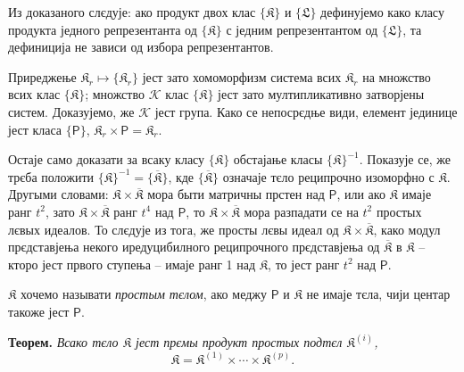 \documentclass[11pt]{article}
\begin{document}
Из доказаного слєдује: ако продукт двох клас \(\{\mathfrak K\}\) и \(\{\mathfrak L\}\) дефинујемо како класу продукта једного репрезентанта од \(\{\mathfrak K\}\) с једним репрезентантом од \(\{\mathfrak L\}\), та дефиниција не зависи од избора репрезентантов.

Приреджење \(\mathfrak K_r\mapsto\{\mathfrak K_r\}\) јест зато хомоморфизм система всих \(\mathfrak K_r\) на множство всих клас \(\{\mathfrak K\}\); множство \(\mathscr K\) клас \(\{\mathfrak K\}\) јест зато мултипликативно затворјены систем. Доказујемо, же \(\mathscr K\) јест група. Како се непосрєдње види, елемент јединице јест класа \(\{\mathsf P\}\), \(\mathfrak K_r\times\mathsf P=\mathfrak K_r\).

Остаје само доказати за всаку класу \(\{\mathfrak K\}\) обстајање класы \(\{\mathfrak K\}^{-1}\). Показује се, же трєба положити \(\{\mathfrak K\}^{-1}=\{\overline{\mathfrak K}\}\), кде \(\{\overline{\mathfrak K}\}\) означаје тєло реципрочно изоморфно с \(\mathfrak K\). Другыми словами: \(\mathfrak K\times\overline{\mathfrak K}\) мора быти матричны прстен над \(\mathsf P\), или ако \(\mathfrak K\) имаје ранг \(t^2\), зато \(\mathfrak K\times\overline{\mathfrak K}\) ранг \(t^4\) над \(\mathsf P\), то \(\mathfrak K\times\overline{\mathfrak K}\) мора разпадати се на \(t^2\) простых лєвых идеалов. То слєдује из тога, же просты лєвы идеал од \(\mathfrak K\times\overline{\mathfrak K}\), како модул прєдставјења некого иредуцибилного реципрочного прєдставјења од \(\overline{\mathfrak K}\) в \(\mathfrak K\) -- кторо јест првого ступења -- имаје ранг 1 над \(\mathfrak K\), то јест ранг \(t^2\) над \(\mathsf P\).

\(\mathfrak K\) хочемо называти \emph{простым тєлом}, ако меджу \(\mathsf P\) и \(\mathfrak K\) не имаје тєла, чији центар такоже јест \(\mathsf P\).

\textbf{Теорем.} \emph{Всако тєло \(\mathfrak K\) јест прємы продукт простых подтєл \(\mathfrak K^{(i)}\),}
\[
\mathfrak K=\mathfrak K^{(1)}\times\cdots\times\mathfrak K^{(p)}.
\]
\end{document}
